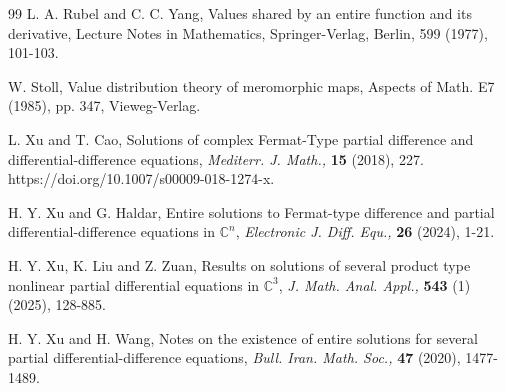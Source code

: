 \documentclass[11pt, reqno]{amsart}
\numberwithin{equation}{section}
\begin{document}
\begin{thebibliography}{99}
 {\sc L. A. Rubel} and {\sc C. C. Yang}, Values shared by an entire function and its derivative, Lecture Notes in Mathematics, Springer-Verlag, Berlin, 599 (1977), 101-103.

 {\sc W. Stoll}, Value distribution theory of meromorphic maps, Aspects of Math. E7 (1985), pp. 347, Vieweg-Verlag.

 {\sc L. Xu} and {\sc T. Cao}, Solutions of complex Fermat-Type partial difference and differential-difference equations, \textit{Mediterr. J. Math.,} \textbf{15} (2018), 227.  https://doi.org/10.1007/s00009-018-1274-x.

 {\sc H. Y. Xu} and {\sc G. Haldar}, Entire solutions to Fermat-type difference and partial differential-difference equations in $\mathbb{C}^n$, \textit{Electronic J. Diff. Equ.,} \textbf{26} (2024), 1-21.

 {\sc H. Y. Xu}, {\sc K. Liu} and {\sc Z. Zuan}, Results on solutions of several product type nonlinear partial differential equations in $\mathbb{C}^3$, \textit{J. Math. Anal. Appl.,} \textbf{543} (1) (2025), 128-885.

 {\sc H. Y. Xu} and {\sc H. Wang}, Notes on the existence of entire solutions for several partial differential-difference equations, \textit{Bull. Iran. Math. Soc.,} \textbf{47} (2020), 1477-1489. 

\end{thebibliography}  
\end{document}
